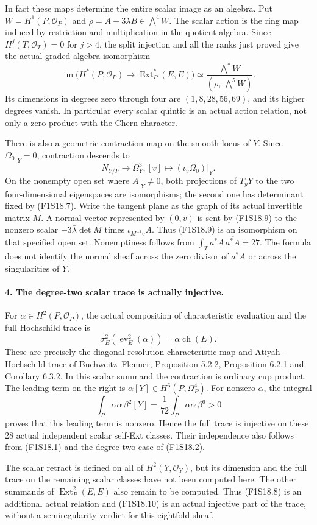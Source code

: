 In fact these maps determine the entire scalar image as an algebra.
Put $W=H^1(P,\mathcal O_P)$ and
$\rho=\bar A-3\lambda\bar B\in\bigwedge^4W$.
The scalar action is the ring map induced by restriction and
multiplication in the quotient algebra. Since
$H^j(T,\mathcal O_T)=0$ for $j>4$, the split injection and all
the ranks just proved give the actual graded-algebra isomorphism
\[
 \operatorname{im}\bigl(H^*(P,\mathcal O_P)
                 \longrightarrow\operatorname{Ext}^*_P(E,E)\bigr)
       \simeq\frac{\bigwedge^*W}{(\rho,\,\bigwedge^5W)}.
 \tag{F1S18.8a}
\]
Its dimensions in degrees zero through four are
$(1,8,28,56,69)$, and its higher degrees vanish. In particular
every scalar quintic is an actual action relation, not only a
zero product with the Chern character.

There is also a geometric contraction map on the smooth locus of
$Y$. Since $\Omega_0|_Y=0$, contraction descends to
\[
             N_{Y/P}\longrightarrow\Omega_Y^3,
                   [v]\longmapsto(\iota_v\Omega_0)|_Y.
 \tag{F1S18.9}
\]
On the nonempty open set where $A|_Y\ne0$, both projections of
$T_yY$ to the two four-dimensional eigenspaces are isomorphisms;
the second one has determinant fixed by (F1S18.7). Write the
tangent plane as the graph of its actual invertible matrix $M$.
A normal vector represented by $(0,v)$ is sent by (F1S18.9) to
the nonzero scalar $-3\bar\lambda\det M$ times
$\iota_{M^{-1}v}A$. Thus (F1S18.9) is an isomorphism on that
specified open set. Nonemptiness follows from
$\int_Ta^*A\,\overline{a^*A}=27$. The formula does not identify
the normal sheaf across the zero divisor of $a^*A$ or across
the singularities of $Y$.

\paragraph{4. The degree-two scalar trace is actually injective.}
For $\alpha\in H^2(P,\mathcal O_P)$, the actual composition
of characteristic evaluation and the full Hochschild trace is
\[
         \sigma_E^2(\operatorname{ev}_E^2(\alpha))
                               =\alpha\operatorname{ch}(E).
 \tag{F1S18.10}
\]
These are precisely the diagonal-resolution characteristic map
and Atiyah--Hochschild trace of Buchweitz--Flenner,
Proposition 5.2.2, Proposition 6.2.1 and Corollary 6.3.2.
In this scalar summand the
contraction is ordinary cup product. The leading term on the
right is $\alpha[Y]\in H^6(P,\Omega_P^4)$. For nonzero $\alpha$,
the integral
\[
      \int_P\alpha\bar\alpha\,\beta^2[Y]
            =\frac1{72}\int_P\alpha\bar\alpha\,\beta^6>0
 \tag{F1S18.11}
\]
proves that this leading term is nonzero. Hence the full trace
is injective on these 28 actual independent scalar self-Ext
classes. Their independence also follows from (F1S18.1) and
the degree-two case of (F1S18.2).

The scalar retract is defined on all of $H^2(Y,\mathcal O_Y)$,
but its dimension and the full trace on the remaining scalar
classes have not been computed here. The other summands of
$\operatorname{Ext}^2_P(E,E)$ also remain to be computed. Thus
(F1S18.8) is an additional actual relation and (F1S18.10) is an
actual injective part of the trace, without a semiregularity
verdict for this eightfold sheaf.
